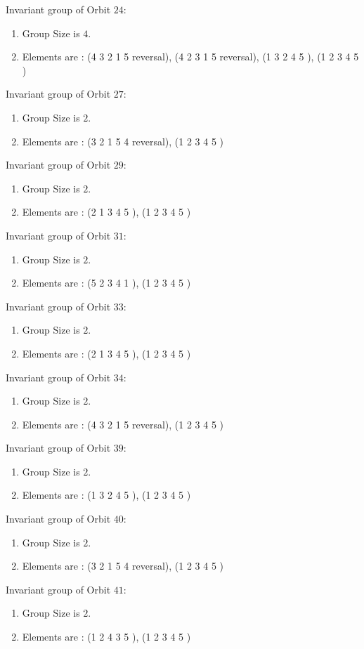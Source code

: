 \documentclass[12pt]{article}
\begin{document}
Invariant group of Orbit $24$:
\begin{enumerate}
\item Group Size is $4$.
\item Elements are : (4 3 2 1 5   reversal), (4 2 3 1 5   reversal), (1 3 2 4 5  ), (1 2 3 4 5  )
\end{enumerate}
Invariant group of Orbit $27$:
\begin{enumerate}
\item Group Size is $2$.
\item Elements are : (3 2 1 5 4   reversal), (1 2 3 4 5  )
\end{enumerate}
Invariant group of Orbit $29$:
\begin{enumerate}
\item Group Size is $2$.
\item Elements are : (2 1 3 4 5  ), (1 2 3 4 5  )
\end{enumerate}
Invariant group of Orbit $31$:
\begin{enumerate}
\item Group Size is $2$.
\item Elements are : (5 2 3 4 1  ), (1 2 3 4 5  )
\end{enumerate}
Invariant group of Orbit $33$:
\begin{enumerate}
\item Group Size is $2$.
\item Elements are : (2 1 3 4 5  ), (1 2 3 4 5  )
\end{enumerate}
Invariant group of Orbit $34$:
\begin{enumerate}
\item Group Size is $2$.
\item Elements are : (4 3 2 1 5   reversal), (1 2 3 4 5  )
\end{enumerate}
Invariant group of Orbit $39$:
\begin{enumerate}
\item Group Size is $2$.
\item Elements are : (1 3 2 4 5  ), (1 2 3 4 5  )
\end{enumerate}
Invariant group of Orbit $40$:
\begin{enumerate}
\item Group Size is $2$.
\item Elements are : (3 2 1 5 4   reversal), (1 2 3 4 5  )
\end{enumerate}
Invariant group of Orbit $41$:
\begin{enumerate}
\item Group Size is $2$.
\item Elements are : (1 2 4 3 5  ), (1 2 3 4 5  )
\end{enumerate}
\end{document}
